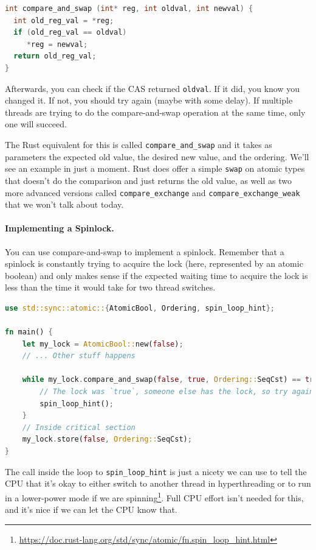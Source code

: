 \documentclass[a4paper]{report}
\begin{document}
  \begin{lstlisting}[language=C]
int compare_and_swap (int* reg, int oldval, int newval) {
  int old_reg_val = *reg;
  if (old_reg_val == oldval) 
     *reg = newval;
  return old_reg_val;
}
  \end{lstlisting}

Afterwards, you can check if the CAS returned {\tt oldval}. If it did, you know you changed it. If not, you should try again (maybe with some delay). If multiple threads are trying to do the compare-and-swap operation at the same time, only one will succeed. 

The Rust equivalent for this is called \texttt{compare\_and\_swap} and it takes as parameters the expected old value, the desired new value, and the ordering. We'll see an example in just a moment. Rust does offer a simple \texttt{swap} on atomic types that doesn't do the comparison and just returns the old value, as well as two more advanced versions called \texttt{compare\_exchange} and \texttt{compare\_exchange\_weak} that we won't talk about today.

\paragraph{Implementing a Spinlock.}
You can use compare-and-swap to implement a spinlock. Remember that a spinlock is constantly trying to acquire the lock (here, represented by an atomic boolean) and only makes sense if the expected waiting time to acquire the lock is less than the time it would take for two thread switches.

\begin{lstlisting}[language=Rust]
use std::sync::atomic::{AtomicBool, Ordering, spin_loop_hint};

fn main() {
    let my_lock = AtomicBool::new(false);
    // ... Other stuff happens

    while my_lock.compare_and_swap(false, true, Ordering::SeqCst) == true {
        // The lock was `true`, someone else has the lock, so try again
        spin_loop_hint();
    }
    // Inside critical section
    my_lock.store(false, Ordering::SeqCst);
}
  \end{lstlisting}

The call inside the loop to \texttt{spin\_loop\_hint} is just a nicety we can use to tell the CPU that it's okay to either switch to another thread in hyperthreading or to run in a lower-power mode if we are spinning\footnote{\url{https://doc.rust-lang.org/std/sync/atomic/fn.spin_loop_hint.html}}. Full CPU effort isn't needed for this, and it's nice if we can let the CPU know that. 
\end{document}
